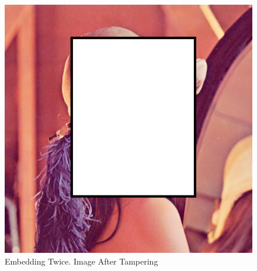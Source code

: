 \documentclass[12pt]{article}
\begin{document}
\begin{figure}[h]
\centerline{%
\includegraphics[scale=0.45]{"Lena Embed twice 0.7 threshold/finalImage - Copy"}%
}%
\caption{Embedding Twice. Image After Tampering}
\label{fig:lenaEmbedTwiceTampered}
\end{figure}
\end{document}
